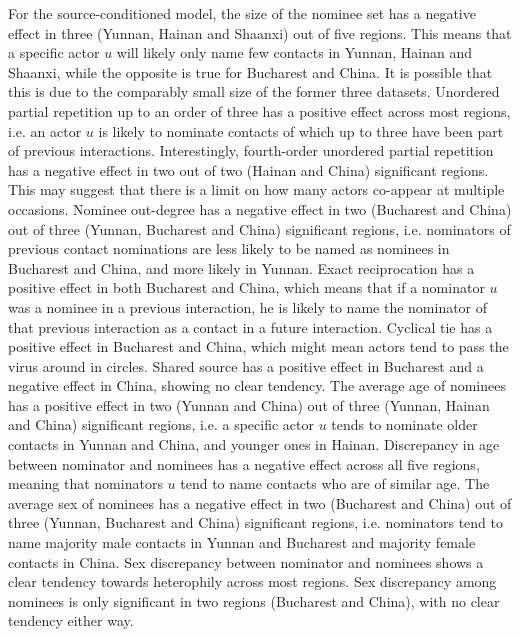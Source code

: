 For the source-conditioned model, the size of the nominee set has a negative effect in three (Yunnan, Hainan and Shaanxi) out of five regions. This means that a specific actor $u$ will likely only name few contacts in Yunnan, Hainan and Shaanxi, while the opposite is true for Bucharest and China. It is possible that this is due to the comparably small size of the former three datasets. Unordered partial repetition up to an order of three has a positive effect across most regions, i.e. an actor $u$ is likely to nominate contacts of which up to three have been part of previous interactions.  Interestingly, fourth-order unordered partial repetition has a negative effect in two out of two (Hainan and China) significant regions. This may suggest that there is a limit on how many actors co-appear at multiple occasions. Nominee out-degree has a negative effect in two (Bucharest and China) out of three (Yunnan, Bucharest and China) significant regions, i.e. nominators of previous contact nominations are less likely to be named as nominees in Bucharest and China, and more likely in Yunnan. Exact reciprocation has a positive effect in both Bucharest and China, which means that if a nominator $u$ was a nominee in a previous interaction, he is likely to name the nominator of that previous interaction as a contact in a future interaction. Cyclical tie has a positive effect in Bucharest and China, which might mean actors tend to pass the virus around in circles. Shared source has a positive effect in Bucharest and a negative effect in China, showing no clear tendency. The average age of nominees has a positive effect in two (Yunnan and China) out of three (Yunnan, Hainan and China) significant regions, i.e. a specific actor $u$ tends to nominate older contacts in Yunnan and China, and younger ones in Hainan. Discrepancy in age between nominator and nominees has a negative effect across all five regions, meaning that nominators $u$ tend to name contacts who are of similar age. The average sex of nominees has a negative effect in two (Bucharest and China) out of three (Yunnan, Bucharest and China) significant regions, i.e. nominators tend to name majority male contacts in Yunnan and Bucharest and majority female contacts in China. Sex discrepancy between nominator and nominees shows a clear tendency towards heterophily across most regions. Sex discrepancy among nominees is only significant in two regions (Bucharest and China), with no clear tendency either way. 

